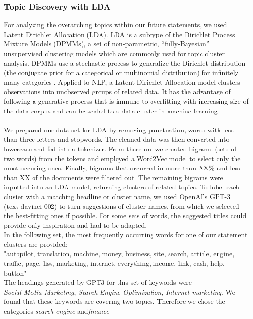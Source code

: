 \subsubsection{Topic Discovery with LDA}
For analyzing the overarching topics within our future statements, we used Latent Dirichlet Allocation (LDA). LDA is a subtype of the Dirichlet Process Mixture Models (DPMMs), a set of non-parametric, “fully-Bayesian” unsupervised clustering models which are commonly used for topic cluster analysis. DPMMs use a stochastic process to generalize the Dirichlet distribution (the conjugate prior for a categorical or multinomial distribution) for infinitely many categories \citep{li2019tutorial}.
Applied to NLP, a Latent Dirichlet Allocation model clusters observations into unobserved groups of related data. It has the advantage of following a generative process that is immune to overfitting with increasing size of the data corpus and can be scaled to a data cluster in machine learning \citep{pritchard2000inference}
\\
\\
We prepared our data set for LDA by removing punctuation, words with less than three letters and stopwords. The cleaned data was then converted into lowercase and fed into a tokenizer. From there on, we created bigrams (sets of two words) from the tokens and employed a Word2Vec model to select only the most occuring ones.
Finally, bigrams that occurred in more than XX\% and less than XX of the documents were filtered out. The remaining bigrams were inputted into an LDA model, returning clusters of related topics. To label each cluster with a matching headline or cluster name, we used OpenAI’s GPT-3 (text-davinci-002) to turn suggestions of cluster names, from which we selected the best-fitting ones if possible. 
For some sets of words, the suggested titles could provide only inspiration and had to be adapted.
\\
In the following set, the most frequently occurring words for one of our statement clusters are provided:
\\
"autopilot, translation, machine, money, business, site, search, article, engine, traffic, page, list, marketing, internet, everything, income, link, cash, help, button"
\\
The headings generated by GPT3 for this set of keywords were 
\\
\emph{Social Media Marketing}, \emph{Search Engine Optimization}, \emph{Internet marketing}.
We found that these keywords are covering two topics.
Therefore we chose the categories \emph{search engine} and\emph{finance}
